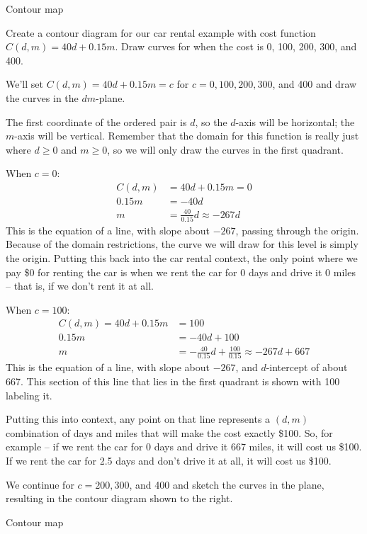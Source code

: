 Contour map
\begin{example}
Create a contour diagram for our car rental example with cost function $C(d,m)=40d+0.15m$. Draw curves for when the cost is 0, 100, 200, 300, and 400.

\begin{solution}
  We'll set $C(d,m)=40d+0.15m=c$ for $c = 0, 100, 200, 300$, and 400 and draw the curves in the $dm$-plane.

The first coordinate of the ordered pair is $d$, so the $d$-axis will be horizontal; the $m$-axis will be vertical. Remember that the domain for this function is really just where $d \geq 0$ and $m \geq 0$, so we will only draw the curves in the first quadrant.

When $c=0$:
\begin{align*}
C(d,m)  &= 40d + 0.15m = 0 \\
0.15m   &= -40d \\
m       &= \frac{40}{0.15}d \approx   -267d
\end{align*}
This is the equation of a line, with slope about $-267$, passing through the origin. Because of the domain restrictions, the curve we will draw for this level is simply the origin. Putting this back into the car rental context, the only point where we pay \$0 for renting the car is when we rent the car for 0 days and drive it 0 miles -- that is, if we don't rent it at all.

When $c=100$:
\begin{align*}
C(d,m) = 40d + 0.15m &= 100 \\
    0.15m &= -40d+100 \\
    m &= -\frac{40}{0.15}d + \frac{100}{0.15}\approx   -267d+667
\end{align*}
This is the equation of a line, with slope about $-267$, and $d$-intercept of about 667. This section of this line that lies in the first quadrant is shown with 100 labeling it.

Putting this into context, any point on that line represents a $(d,m)$ combination of days and miles that will make the cost exactly \$100. So, for example -- if we rent the car for 0 days and drive it 667 miles, it will cost us \$100. If we rent the car for 2.5 days and don't drive it at all, it will cost us \$100.

We continue for $c= 200, 300$, and 400 and sketch the curves in the plane, resulting in the contour diagram shown to the right.

Contour map
\end{solution}\end{example}

